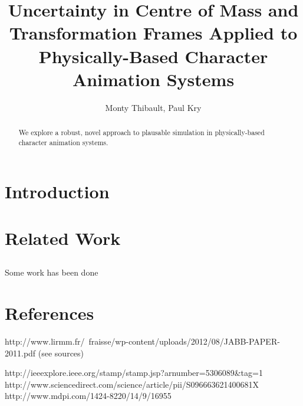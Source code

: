\documentclass[]{article}
\title{Uncertainty in Centre of Mass and Transformation Frames Applied to Physically-Based Character Animation Systems}
\author{Monty Thibault, Paul Kry}
\begin{document}
\maketitle

\begin{abstract}
We explore a robust, novel approach to plausable simulation in physically-based character animation systems. \cite{2010-TOG-gbwc}
\end{abstract}

\section{Introduction}

\section{Related Work}
\subsection{}

Some work has been done 

\section{References}

\printbibliography


http://www.lirmm.fr/~fraisse/wp-content/uploads/2012/08/JABB-PAPER-2011.pdf (see sources)


http://ieeexplore.ieee.org/stamp/stamp.jsp?arnumber=5306089&tag=1
http://www.sciencedirect.com/science/article/pii/S096663621400681X
http://www.mdpi.com/1424-8220/14/9/16955
\end{document}
